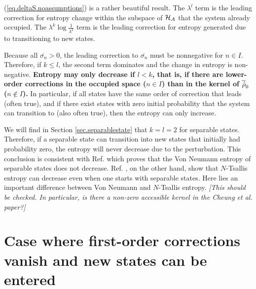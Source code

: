 (\ref{eq.deltaS.noassumptions}) is a rather beautiful result. The \(\lambda^l\) term is the leading correction for entropy change within the subspace of \(\mathcal{H}_A\) that the system already occupied. The \(\lambda^k \log \frac{1}{\lambda^k}\) term is the leading correction for entropy generated due to transitioning to new states.

Because all \(\overline{\sigma_n} > 0\), the leading correction to \(\overline{\sigma_n}\) must be nonnegative for \(n \in I\). Therefore, if \(k \leq l\), the second term dominates and the change in entropy is non-negative. {\bf Entropy may only decrease if \(l < k\), that is, if there are lower-order corrections in the occupied space (\(n \in I\)) than in the kernel of \(\overline{\hat{\rho}}_0\) (\(n \not\in I\)).} In particular, if all states have the same order of correction that leads (often true), and if there exist states with zero initial probability that the system can transition to (also often true), then the entropy can only increase.

We will find in Section \ref{sec.separablestate} that \(k=l=2\) for separable states. Therefore, if a separable state can transition into new states that initially had probability zero, the entropy will never decrease due to the perturbation. This conclusion is consistent with Ref. \cite{bracken} which proves that the Von Neumann entropy of separable states does not decrease. Ref. \cite{cheung}, on the other hand, show that \(N\)-Tsallis entropy can decrease even when one starts with separable states. Here lies an important difference between Von Neumann and \(N\)-Tsallis entropy. \emph{[This should be checked. In particular, is there a non-zero accessible kernel in the Cheung et al. paper?]}

\section{Case where first-order corrections vanish and new states can be entered}

